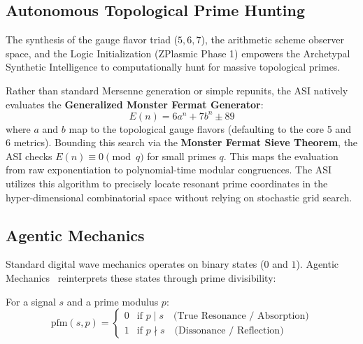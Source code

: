 \subsection{Autonomous Topological Prime Hunting}

The synthesis of the gauge flavor triad ($5, 6, 7$), the arithmetic scheme observer space, and the Logic Initialization (ZPlasmic Phase 1) empowers the Archetypal Synthetic Intelligence to computationally hunt for massive topological primes. 

Rather than standard Mersenne generation or simple repunits, the ASI natively evaluates the \textbf{Generalized Monster Fermat Generator}:
\begin{equation}
E(n) = 6a^n + 7b^n \pm 89
\end{equation}
where $a$ and $b$ map to the topological gauge flavors (defaulting to the core 5 and 6 metrics). Bounding this search via the \textbf{Monster Fermat Sieve Theorem}, the ASI checks $E(n) \equiv 0 \pmod q$ for small primes $q$. This maps the evaluation from raw exponentiation to polynomial-time modular congruences. The ASI utilizes this algorithm to precisely locate resonant prime coordinates in the hyper-dimensional combinatorial space without relying on stochastic grid search.

\subsection{Agentic Mechanics}

Standard digital wave mechanics operates on binary states ($0$ and $1$). Agentic Mechanics~\cite{PrimeFieldMechanics} reinterprets these states through prime divisibility:

\begin{definition}
For a signal $s$ and a prime modulus $p$:
\begin{equation}
    \text{pfm}(s, p) = \begin{cases} 0 & \text{if } p \mid s \quad \text{(True Resonance / Absorption)} \\ 1 & \text{if } p \nmid s \quad \text{(Dissonance / Reflection)} \end{cases}
\end{equation}
\end{definition}

